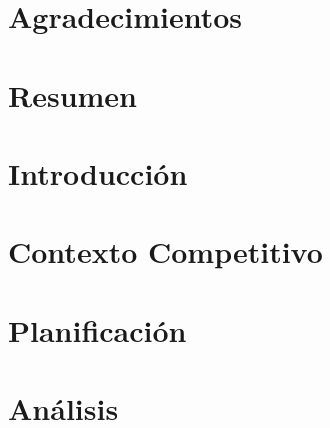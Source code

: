 \documentclass[a4paper, 11pt, oneside]{memoir}
\title{\izenburua}
\author{\egilea}
\date{\data}
\begin{document}

% 


\cleardoublepage
\frontmatter


\chapter*{Agradecimientos}

\cleardoublepage


\chapter*{Resumen}

\cleardoublepage


\tableofcontents
\clearpage
\listoffigures
\clearpage
\listoftables
\clearpage


\cleardoublepage
\mainmatter
\pagestyle{ruled}

\chapter{Introducción} \label{ch:introduccion}

\cleardoublepage

\chapter{Contexto Competitivo} \label{ch:contextoCompetitivo}

\cleardoublepage

\chapter{Planificación} \label{ch:planificacion}

\cleardoublepage

\chapter{Análisis} \label{ch:analisis}

\cleardoublepage
\end{document}
